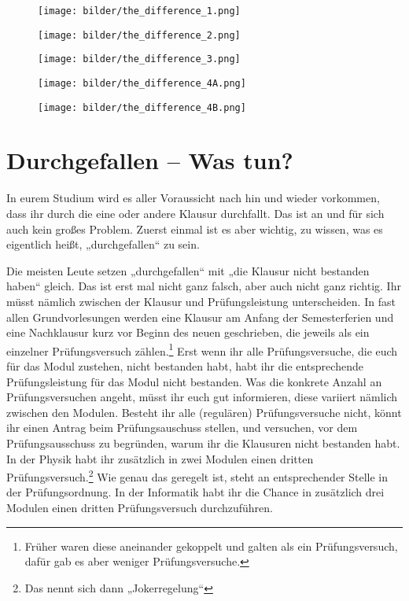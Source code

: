 
\begin{figure*}[t]
    \centering
    \begin{subfigure}[b]{.18\textwidth}
        \texttt{[image: bilder/the\_difference\_1.png]}
    \end{subfigure}
    \begin{subfigure}[b]{.18\textwidth}
        \texttt{[image: bilder/the\_difference\_2.png]}
    \end{subfigure}
    \begin{subfigure}[b]{.18\textwidth}
        \texttt{[image: bilder/the\_difference\_3.png]}
    \end{subfigure}
    \begin{subfigure}[b]{.18\textwidth}
        \texttt{[image: bilder/the\_difference\_4A.png]}
    \end{subfigure}
    \begin{subfigure}[b]{.18\textwidth}
        \texttt{[image: bilder/the\_difference\_4B.png]}
    \end{subfigure}
\end{figure*}

\vspace{-3mm}
\section{Durchgefallen -- Was tun?}

In eurem Studium wird es aller Voraussicht nach hin und wieder vorkommen, dass ihr durch die eine oder andere Klausur durchfallt. Das ist an und für sich auch kein großes Problem. Zuerst einmal ist es aber wichtig, zu wissen, was es eigentlich heißt, „durchgefallen“ zu sein.

Die meisten Leute setzen „durchgefallen“ mit „die Klausur nicht bestanden haben“ gleich. Das ist erst mal nicht ganz falsch, aber auch nicht ganz richtig. Ihr müsst nämlich zwischen der Klausur und Prüfungsleistung unterscheiden. In fast allen Grundvorlesungen werden eine Klausur am Anfang der Semesterferien und eine Nachklausur kurz vor Beginn des neuen geschrieben, die jeweils als ein einzelner Prüfungsversuch zählen.\footnote{Früher waren diese aneinander gekoppelt und galten als ein Prüfungsversuch, dafür gab es aber weniger Prüfungsversuche.}
Erst wenn ihr alle Prüfungsversuche, die euch für das Modul zustehen, nicht bestanden habt, habt ihr die entsprechende Prüfungsleistung für das Modul nicht bestanden. Was die konkrete Anzahl an Prüfungsversuchen angeht, müsst ihr euch gut informieren, diese variiert nämlich zwischen den Modulen. Besteht ihr alle (regulären) Prüfungsversuche nicht, könnt ihr einen Antrag beim Prüfungsauschuss stellen, und versuchen, vor dem Prüfungsausschuss zu begründen, warum ihr die Klausuren nicht bestanden habt. In der Physik habt ihr zusätzlich in zwei Modulen einen dritten Prüfungsversuch.\footnote{Das nennt sich dann „Jokerregelung“} Wie genau das geregelt ist, steht an entsprechender Stelle in der Prüfungsordnung. In der Informatik habt ihr die Chance in zusätzlich drei Modulen einen dritten Prüfungsversuch durchzuführen.

